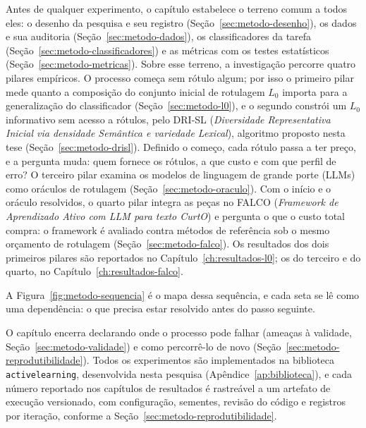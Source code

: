 Antes de qualquer experimento, o capítulo estabelece o terreno comum a
todos eles: o desenho da pesquisa e seu registro
(Seção~\ref{sec:metodo-desenho}), os dados e sua auditoria
(Seção~\ref{sec:metodo-dados}), os classificadores da tarefa
(Seção~\ref{sec:metodo-classificadores}) e as métricas com os testes
estatísticos (Seção~\ref{sec:metodo-metricas}). Sobre esse terreno, a
investigação percorre quatro pilares empíricos. O processo começa sem
rótulo algum; por isso o primeiro pilar mede quanto a composição do
conjunto inicial de rotulagem $L_0$ importa para a generalização do
classificador (Seção~\ref{sec:metodo-l0}), e o segundo constrói um $L_0$
informativo sem acesso a rótulos, pelo DRI-SL (\textit{Diversidade
Representativa Inicial via densidade Semântica e variedade Lexical}),
algoritmo proposto nesta tese (Seção~\ref{sec:metodo-drisl}). Definido o
começo, cada rótulo passa a ter preço, e a pergunta muda: quem fornece os
rótulos, a que custo e com que perfil de erro? O terceiro pilar examina os
modelos de linguagem de grande porte (LLMs) como oráculos de rotulagem
(Seção~\ref{sec:metodo-oraculo}). Com o início e o oráculo resolvidos, o
quarto pilar integra as peças no FALCO (\textit{Framework de Aprendizado
Ativo com LLM para texto CurtO}) e pergunta o que o custo total compra: o
framework é avaliado contra métodos de referência sob o mesmo orçamento de
rotulagem (Seção~\ref{sec:metodo-falco}). Os resultados dos dois primeiros
pilares são reportados no Capítulo~\ref{ch:resultados-l0}; os do terceiro e
do quarto, no Capítulo~\ref{ch:resultados-falco}.

A Figura~\ref{fig:metodo-sequencia} é o mapa dessa sequência, e cada seta
se lê como uma dependência: o que precisa estar resolvido antes do passo
seguinte.


O capítulo encerra declarando onde o processo pode falhar (ameaças à
validade, Seção~\ref{sec:metodo-validade}) e como percorrê-lo de novo
(Seção~\ref{sec:metodo-reprodutibilidade}). Todos os experimentos são
implementados na biblioteca \texttt{activelearning}, desenvolvida nesta
pesquisa (Apêndice~\ref{ap:biblioteca}), e cada número reportado nos
capítulos de resultados é rastreável a um artefato de execução versionado,
com configuração, sementes, revisão do código e registros por iteração,
conforme a Seção~\ref{sec:metodo-reprodutibilidade}.


